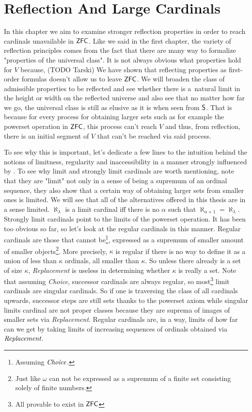 \section{Reflection And Large Cardinals}

In this chapter we aim to examine stronger reflection properties in order to reach cardinals unavailable in $\sf{ZFC}$. Like we said in the first chapter, %
the variety of reflection principles comes from the fact that there are many way to formalize "properties of the universal class". It is not always obvious what properties hold for $V$ because, (TODO Tarski)
We have shown that reflecting properties as first-order formulas doesn't allow us to leave $\sf{ZFC}$. We will broaden the class of admissible properties to be reflected and see whether there is a~natural limit in the height or width on the reflected universe and also see that no matter how far we go, the universal class is still as elusive as it is when seen from $\sf{S}$. That is because for every process for obtaining larger sets such as for example the powerset operation in $\sf{ZFC}$, this process can't reach $V$ and thus, from reflection, there is an initial segment of $V$ that can't be reached via said process. 

To see why this is important, let's dedicate a few lines to the intuition behind the notions of limitness, regularity and inaccessibility in a manner strongly influenced by \cite{Infinity_in_mind}. To see why limit and strongly limit cardinals are worth mentioning, note that they are "limit" not only in a sense of being a supremum of an ordinal sequence, they also show that a certain way of obtaining larger sets from smaller ones is limited. We will see that all of the alternatives offered in this thesis are in a sense limited. 
$\aleph_\lambda$ is a limit cardinal iff there is no $\alpha$ such that $\aleph_{\alpha+1}=\aleph_\lambda$. Strongly limit cardinals point to the limits of the powerset operation. It has been too obvious so far, so let's look at the regular cardinals in this manner. Regular cardinals are those that cannot be\footnote{Assuming $\emph{Choice}$.}, expressed as a supremum of smaller amount of smaller objects\footnote{Just like $\omega$ can not be expressed as a supremum of a finite set consisting solely of finite numbers.}. More precisely, $\kappa$ is regular if there is no way to define it as a union of less than $\kappa$ ordinals, all smaller than $\kappa$. So unless there already is a set of size $\kappa$, \emph{Replacement} is useless in determining whether $\kappa$ is really a set. Note that assuming \emph{Choice}, successor cardinals are always regular, so most\footnote{All provable to exist in $\sf{ZFC}$} limit cardinals are singular cardinals. So if one is traversing the class of all cardinals upwards, successor steps are still sets thanks to the powerset axiom while singular limits cardinal are not proper classes because they are suprema of images of smaller sets via \emph{Replacement}. Regular cardinals are, in a way, limits of how far can we get by taking limits of increasing sequences of ordinals obtained via $\emph{Replacement}$.

